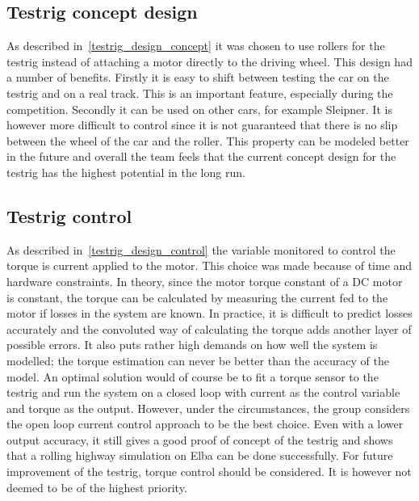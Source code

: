 \subsection{Testrig concept design}
As described in~\ref{testrig_design_concept} it was chosen to use rollers for the testrig instead of attaching a motor directly to the driving wheel. This design had a number of benefits. Firstly it is easy to shift between testing the car on the testrig and on a real track. This is an important feature, especially during the competition. Secondly it can be used on other cars, for example Sleipner. It is however more difficult to control since it is not guaranteed that there is no slip between the wheel of the car and the roller. This property can be modeled better in the future and overall the team feels that the current concept design for the testrig has the highest potential in the long run.

\subsection{Testrig control}
As described in~\ref{testrig_design_control} the variable monitored to control the torque is current applied to the motor. This choice was made because of time
and hardware constraints. In theory, since the motor torque constant of a DC motor is
constant, the torque can be calculated by measuring the current fed to the
motor if losses in the system are known. In practice, it is difficult to
predict losses accurately and the convoluted way of calculating the torque adds
another layer of possible errors. It also puts rather high demands on how well
the system is modelled; the torque estimation can never be better than the
accuracy of the model. An optimal solution would of course be to fit a torque
sensor to the testrig and run the system on a closed loop with current as the
control variable and torque as the output. However, under the
circumstances, the group considers the open loop current control approach to be
the best choice. Even with a lower output accuracy, it still gives a
good proof of concept of the testrig and shows that a rolling highway simulation
on Elba can be done successfully.
For future improvement of the testrig, torque control should be considered. It is however not deemed to be of the highest priority. %


